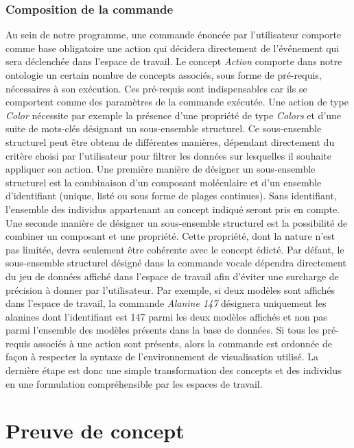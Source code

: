 \subsubsection{Composition de la commande}

Au sein de notre programme, une commande énoncée par l'utilisateur comporte comme base obligatoire une action qui décidera directement de l'événement qui sera déclenchée dans l'espace de travail. Le concept \textit{Action} comporte dans notre ontologie un certain nombre de concepts associés, sous forme de pré-requis, nécessaires à son exécution. Ces pré-requis sont indispensables car ils se comportent comme des paramètres de la commande exécutée. Une action de type \textit{Color} nécessite par exemple la présence d'une propriété de type \textit{Colors} et d'une suite de mots-clés désignant un sous-ensemble structurel. Ce sous-ensemble structurel peut être obtenu de différentes manières, dépendant directement du critère choisi par l'utilisateur pour filtrer les données sur lesquelles il souhaite appliquer son action. Une première manière de désigner un sous-ensemble structurel est la combinaison d'un composant moléculaire et d'un ensemble d'identifiant (unique, listé ou sous forme de plages continues). Sans identifiant, l'ensemble des individus appartenant au concept indiqué seront pris en compte. Une seconde manière de désigner un sous-ensemble structurel est la possibilité de combiner un composant et une propriété. Cette propriété, dont la nature n'est pas limitée, devra seulement être cohérente avec le concept édicté.
Par défaut, le sous-ensemble structurel désigné dans la commande vocale dépendra directement du jeu de données affiché dans l'espace de travail afin d'éviter une surcharge de précision à donner par l'utilisateur. Par exemple, si deux modèles sont affichés dans l'espace de travail, la commande \textit{Alanine 147} désignera uniquement les alanines dont l'identifiant est 147 parmi les deux modèles affichés et non pas parmi l'ensemble des modèles présents dans la base de données.
Si tous les pré-requis associés à une action sont présents, alors la commande est ordonnée de façon à respecter la syntaxe de l'environnement de visualisation utilisé. La dernière étape est donc une simple transformation des concepts et des individus en une formulation compréhensible par les espaces de travail.


\section{Preuve de concept}

